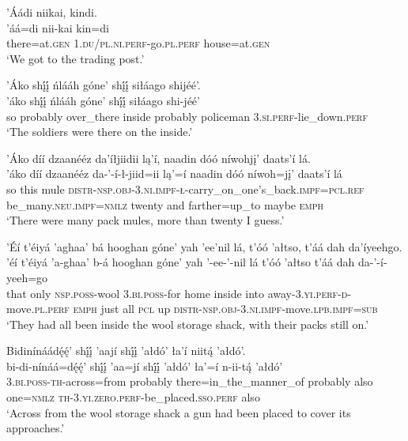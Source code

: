 \ea\label{ex:text1-58-4}
’Áádi niikai, kindi.\\
\gll ’áá=di	nii-kai	kin=di\\
     there=at.\textsc{gen}	1.\textsc{du}/\textsc{pl}.\textsc{ni}.\textsc{perf}-go.\textsc{pl}.\textsc{perf}	house=at.\textsc{gen}\\
\glt `We got to the trading post.'
\z

\ea\label{ex:text1-58-5}
’Áko shį́į́ ńlááh góne’ shį́į́ siłáago shijéé’.\\
\gll ’áko	shį́į́	ńlááh	góne’	shį́į́	siłáago	shi-jéé’\\
     so	probably	over\_there	inside	probably	policeman	3.\textsc{si}.\textsc{perf}-lie\_down.\textsc{perf}\\
\glt `The soldiers were there on the inside.'
\z

\ea\label{ex:text1-58-6}
’Áko díí dzaanééz da’íłjiidii lą’í, naadin dóó níwohjį’ daats’í lá.\\
\gll ’áko	díí	dzaanééz	da-’-í-ł-jiid=ii	lą’=í	naadin	dóó	níwoh=jį’	daats’í	lá\\
     so	this	mule	\textsc{distr}-\textsc{nsp}.\textsc{obj}-3.\textsc{ni}.\textsc{impf}-\textsc{ł}-carry\_on\_one's\_back.\textsc{impf}=\textsc{pcl}.\textsc{ref}	be\_many.\textsc{neu}.\textsc{impf}=\textsc{nmlz}	twenty	and	farther=up\_to	maybe	\textsc{emph}\\
\glt `There were many pack mules, more than twenty I guess.'
\z

\ea\label{ex:text1-58-7}
’Éí t’éiyá ’aghaa’ bá hooghan góne’ yah ’ee’nil lá, t’óó ’ałtso, t’áá dah da’íyeehgo.\\
\gll ’éí	t’éiyá	’a-ghaa’	b-á	hooghan	góne’	yah	’-ee-’-nil	lá	t’óó	’ałtso	t’áá	dah	da-’-í-yeeh=go\\
     that	only	\textsc{nsp}.\textsc{poss}-wool	3.\textsc{bi}.\textsc{poss}-for	home	inside	into	away-3.\textsc{yi}.\textsc{perf}-\textsc{d}-move.\textsc{pl}.\textsc{perf}	\textsc{emph}	just	all	\textsc{pcl}	up	\textsc{distr}-\textsc{nsp}.\textsc{obj}-3.\textsc{ni}.\textsc{impf}-move.\textsc{lpb}.\textsc{impf}=\textsc{sub}\\
\glt `They had all been inside the wool storage shack, with their packs still on.'
\z

\ea\label{ex:text1-58-8}
Bidinínáádę́ę́’ shį́į́ ’aají shį́į́ ’ałdó’ ła’í niitą́ ’ałdó’.\\
\gll bi-di-nínáá=dę́ę́’	shį́į́	’aa=jí	shį́į́	’ałdó’	ła’=í	n-ii-tą́	’ałdó’\\
     3.\textsc{bi}.\textsc{poss}-\textsc{th}-across=from	probably	there=in\_the\_manner\_of	probably	also	one=\textsc{nmlz}	\textsc{th}-3.\textsc{yi}.\textsc{zero}.\textsc{perf}-be\_placed.\textsc{sso}.\textsc{perf}	also\\
\glt `Across from the wool storage shack a gun had been placed to cover its approaches.'
\z

